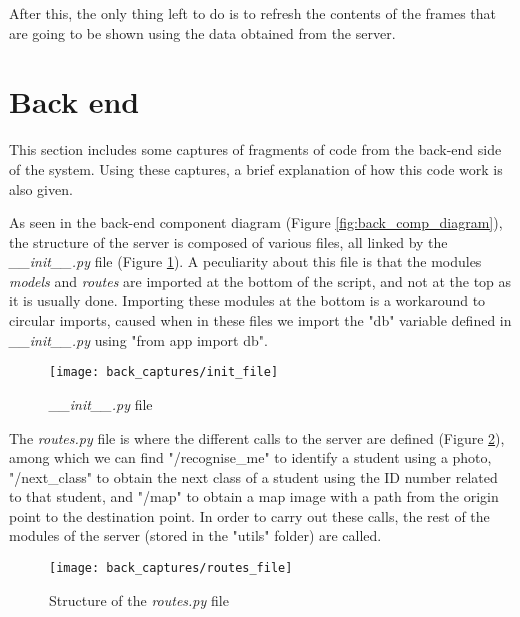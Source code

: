 After this, the only thing left to do is to refresh the contents of the frames that are going to be shown using the data obtained from the server.




\section{Back end}	
This section includes some captures of fragments of code from the back-end side of the system. Using these captures, a brief explanation of how this code work is also given. 

As seen in the back-end component diagram (Figure \ref{fig:back_comp_diagram}), the structure of the server is composed of various files, all linked by the \textit{{\_}{\_}init{\_}{\_}.py} file (Figure \ref{fig:init_file}). A peculiarity about this file is that the modules \textit{models} and \textit{routes} are imported at the bottom of the script, and not at the top as it is usually done. Importing these modules at the bottom is a workaround to circular imports, caused when in these files we import the "db" variable defined in \textit{{\_}{\_}init{\_}{\_}.py} using "from app import db".

\begin{figure}[!ht]
	\centering
	\texttt{[image: back\_captures/init\_file]}
	\caption{\textit{{\_}{\_}init{\_}{\_}.py} file}
	\label{fig:init_file}
\end{figure}

The \textit{routes.py} file is where the different calls to the server are defined (Figure \ref{fig:routes_file}), among which we can find "/recognise{\_}me" to identify a student using a photo, "/next{\_}class" to obtain the next class of a student using the ID number related to that student, and "/map" to obtain a map image with a path from the origin point to the destination point. In order to carry out these calls, the rest of the modules of the server (stored in the "utils" folder) are called. 

\begin{figure}[!ht]
	\centering
	\texttt{[image: back\_captures/routes\_file]}
	\caption{Structure of the \textit{routes.py} file}
	\label{fig:routes_file}
\end{figure}

